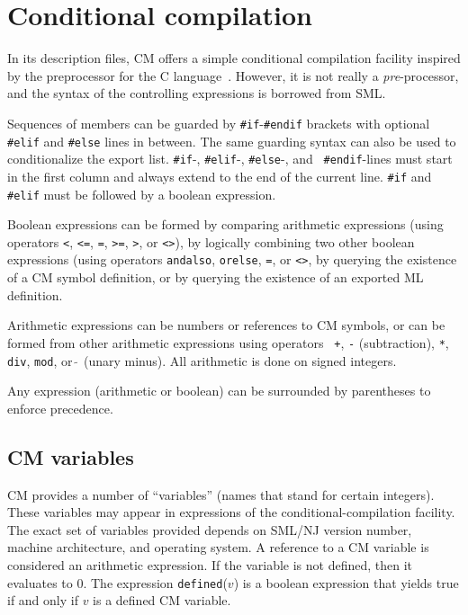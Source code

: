\documentclass[titlepage,letterpaper]{article}
\begin{document}
\section{Conditional compilation}
\label{sec:preproc}

In its description files, CM offers a simple conditional compilation
facility inspired by the preprocessor for the C language~\cite{k&r2}.
However, it is not really a {\it pre}-processor, and the syntax of the
controlling expressions is borrowed from SML.

Sequences of members can be guarded by {\tt \#if}-{\tt \#endif}
brackets with optional {\tt \#elif} and {\tt \#else} lines in between.
The same guarding syntax can also be used to conditionalize the export
list.  {\tt \#if}-, {\tt \#elif}-, {\tt \#else}-, and {\tt
\#endif}-lines must start in the first column and always
extend to the end of the current line.  {\tt \#if} and {\tt \#elif}
must be followed by a boolean expression.

Boolean expressions can be formed by comparing arithmetic expressions
(using operators {\tt <}, {\tt <=}, {\tt =}, {\tt >=}, {\tt >}, or
{\tt <>}), by logically combining two other boolean expressions (using
operators {\tt andalso}, {\tt orelse}, {\tt =}, or {\tt <>}, by
querying the existence of a CM symbol definition, or by querying the
existence of an exported ML definition.

Arithmetic expressions can be numbers or references to CM symbols, or
can be formed from other arithmetic expressions using operators {\tt
+}, {\tt -} (subtraction), \verb|*|, {\tt div}, {\tt mod}, or $\tilde{~}$
(unary minus).  All arithmetic is done on signed integers.

Any expression (arithmetic or boolean) can be surrounded by
parentheses to enforce precedence.

\subsection{CM variables}
\label{sec:cmvars}

CM provides a number of ``variables'' (names that stand for certain
integers). These variables may appear in expressions of the
conditional-compilation facility. The exact set of variables provided
depends on SML/NJ version number, machine architecture, and
operating system.  A reference to a CM variable is considered an
arithmetic expression. If the variable is not defined, then it
evaluates to 0.  The expression {\tt defined}($v$) is a boolean
expression that yields true if and only if $v$ is a defined CM
variable.
\end{document}
